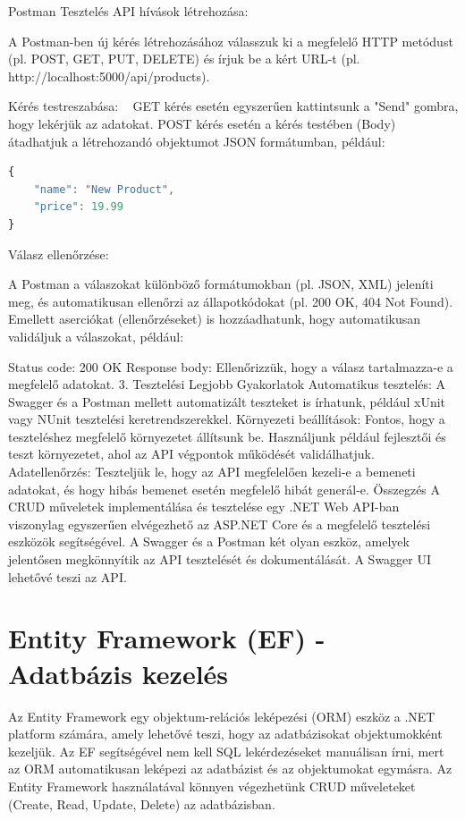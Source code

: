 \documentclass[colorlinks]{thesis-kando}
\theoremstyle{definition}
\theoremstyle{remark}
\begin{document}
Postman Tesztelés
API hívások létrehozása:

A Postman-ben új kérés létrehozásához válasszuk ki a megfelelő HTTP metódust (pl. POST, GET, PUT, DELETE) és írjuk be a kért URL-t (pl. http://localhost:5000/api/products).

Kérés testreszabása: ~
GET kérés esetén egyszerűen kattintsunk a "Send" gombra, hogy lekérjük az adatokat. POST kérés esetén a kérés testében (Body) átadhatjuk a létrehozandó objektumot JSON formátumban, például:

\hspace*{1cm}

\begin{lstlisting}[language=JavaScript]
{
	"name": "New Product",
	"price": 19.99
}
\end{lstlisting}
Válasz ellenőrzése:

A Postman a válaszokat különböző formátumokban (pl. JSON, XML) jeleníti meg, és automatikusan ellenőrzi az állapotkódokat (pl. 200 OK, 404 Not Found). Emellett aserciókat (ellenőrzéseket) is hozzáadhatunk, hogy automatikusan validáljuk a válaszokat, például:

Status code: 200 OK
Response body: Ellenőrizzük, hogy a válasz tartalmazza-e a megfelelő adatokat.
3. Tesztelési Legjobb Gyakorlatok
Automatikus tesztelés: A Swagger és a Postman mellett automatizált teszteket is írhatunk, például xUnit vagy NUnit tesztelési keretrendszerekkel.
Környezeti beállítások: Fontos, hogy a teszteléshez megfelelő környezetet állítsunk be. Használjunk például fejlesztői és teszt környezetet, ahol az API végpontok működését validálhatjuk.
Adatellenőrzés: Teszteljük le, hogy az API megfelelően kezeli-e a bemeneti adatokat, és hogy hibás bemenet esetén megfelelő hibát generál-e.
Összegzés
A CRUD műveletek implementálása és tesztelése egy .NET Web API-ban viszonylag egyszerűen elvégezhető az ASP.NET Core és a megfelelő tesztelési eszközök segítségével. A Swagger és a Postman két olyan eszköz, amelyek jelentősen megkönnyítik az API tesztelését és dokumentálását. A Swagger UI lehetővé teszi az API.

\section {Entity Framework (EF) - Adatbázis kezelés}
Az Entity Framework egy objektum-relációs leképezési (ORM) eszköz a .NET platform számára, amely lehetővé teszi, hogy az adatbázisokat objektumokként kezeljük. Az EF segítségével nem kell SQL lekérdezéseket manuálisan írni, mert az ORM automatikusan leképezi az adatbázist és az objektumokat egymásra. Az Entity Framework használatával könnyen végezhetünk CRUD műveleteket (Create, Read, Update, Delete) az adatbázisban.
\cite{en1}
\end{document}
